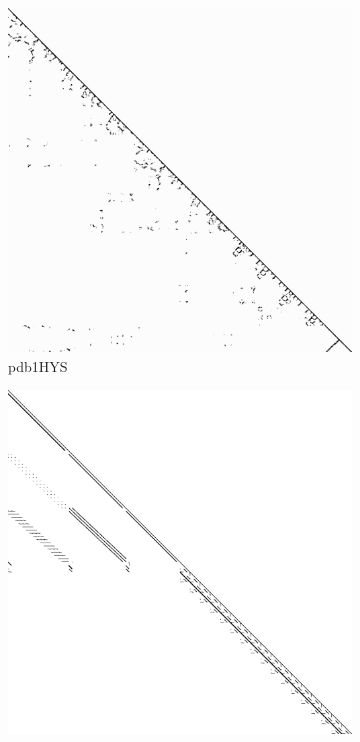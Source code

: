 \begin{figure}
\begin{multicols}{3}
\begin{subfigure}{\linewidth}
\includegraphics[width=\linewidth]{images/pdb1HYS}
\caption{pdb1HYS}
\end{subfigure}
\begin{subfigure}{\linewidth}
\includegraphics[width=\linewidth]{images/consph}

\end{subfigure}
\end{multicols}
\end{figure}
